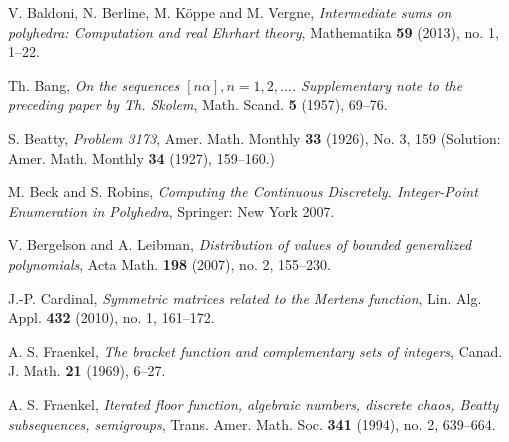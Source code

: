\documentclass[11pt, letterpaper, reqno]{amsart}
\theoremstyle{definition}
\numberwithin{equation}{section}
\begin{document}
{\begin{thebibliography}{99}
V. Baldoni, N. Berline,  M. K\"{o}ppe and M. Vergne,
\emph{Intermediate sums on polyhedra: Computation and real Ehrhart theory},
Mathematika {\bf 59} (2013), no. 1, 1--22.

Th. Bang,
\emph{On the sequences $[n \alpha], n=1, 2, ...$.
Supplementary note to the preceding paper by Th. Skolem},
Math. Scand. {\bf 5}  (1957), 69--76.

S. Beatty, 
{\em Problem 3173}, Amer. Math. Monthly
{\bf 33} (1926), No. 3, 159
(Solution: Amer. Math. Monthly {\bf 34} (1927), 159--160.) 

M. Beck and S. Robins, 
\emph{Computing the Continuous Discretely. Integer-Point Enumeration in Polyhedra},
Springer: New York 2007.

V. Bergelson and A. Leibman,
\emph{Distribution of values of bounded generalized polynomials},
{Acta Math.} {\bf 198} (2007), no. 2,  155--230.


J.-P. Cardinal,
\emph{Symmetric matrices related to the Mertens function},
Lin. Alg. Appl. {\bf 432} (2010), no. 1, 161--172.
 
 
A. S. Fraenkel,
\emph{The bracket function and complementary sets of integers},
Canad. J. Math. {\bf 21} (1969), 6--27.
 
 
A. S. Fraenkel,
\emph{Iterated floor function, algebraic numbers, discrete chaos,
Beatty subsequences, semigroups},
Trans. Amer. Math. Soc. {\bf 341} (1994), no. 2, 639--664.
 
 


\end{thebibliography}}
\end{document}
